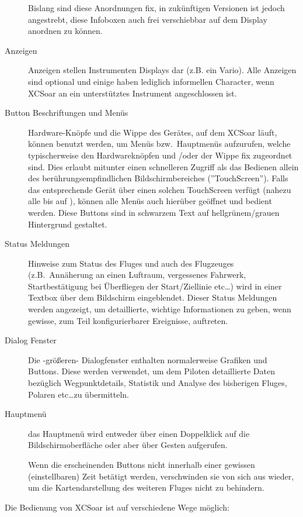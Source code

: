 \begin{description}
Bislang sind diese Anordnungen fix, in zukünftigen Versionen ist jedoch angestrebt, diese Infoboxen auch frei verschiebbar auf dem Display anordnen zu können.
%
\item[Anzeigen] Anzeigen stellen Instrumenten Displays dar (z.B. ein Vario). Alle Anzeigen sind optional und einige
haben lediglich informellen  Character, wenn \textsf{XCSoar} an ein unterstütztes Instrument angeschlossen ist.
%
\item[Button Beschriftungen und Menüs] Hardware-Knöpfe und die Wippe des Gerätes, auf dem \textsf{XCSoar} läuft, können benutzt werden, um Menüs bzw.\ Hauptmenüs aufzurufen, welche typischerweise den Hardwareknöpfen und /oder der Wippe fix zugeordnet sind. Dies erlaubt mitunter einen schnelleren Zugriff als das Bedienen allein des berührungsempfindlichen Bildschirmbereiches (''TouchScreen'').
Falls das entsprechende Gerät über einen solchen TouchScreen verfügt (nahezu alle bis auf \al), können alle Menüs auch
hierüber geöffnet und bedient werden. Diese Buttons sind in schwarzem Text auf hellgrünem/grauen Hintergrund gestaltet.
%
\item[Status Meldungen] Hinweise zum Status des Fluges und auch des Flugzeuges  (z.B.\ Annäherung an einen Luftraum, vergessenes Fahrwerk, Startbestätigung bei Überfliegen der Start/Ziellinie etc\dots ) wird in einer Textbox  über dem Bildschirm eingeblendet.
Dieser Status Meldungen werden angezeigt, um detaillierte, wichtige Informationen zu geben, wenn gewisse, zum Teil konfigurierbarer Ereignisse, auftreten.
%
\item[Dialog Fenster] Die -größeren- Dialogfenster enthalten normalerweise Grafiken und Buttons. Diese werden verwendet, um dem Piloten  detaillierte Daten bezüglich Wegpunktdetails, Statistik und Analyse des bisherigen Fluges, Polaren etc\dots  zu übermitteln.

\item[Hauptmenü] das Hauptmenü wird entweder über einen Doppelklick auf die Bildschirmoberfläche oder aber über Gesten  aufgerufen.

   Wenn die erscheinenden Buttons nicht innerhalb einer gewissen (einstellbaren) Zeit  betätigt  werden, verschwinden sie von sich aus wieder, um die Kartendarstellung des weiteren Fluges nicht zu behindern.
\end{description}

Die Bedienung von \textsf{XCSoar} ist auf verschiedene Wege möglich:

